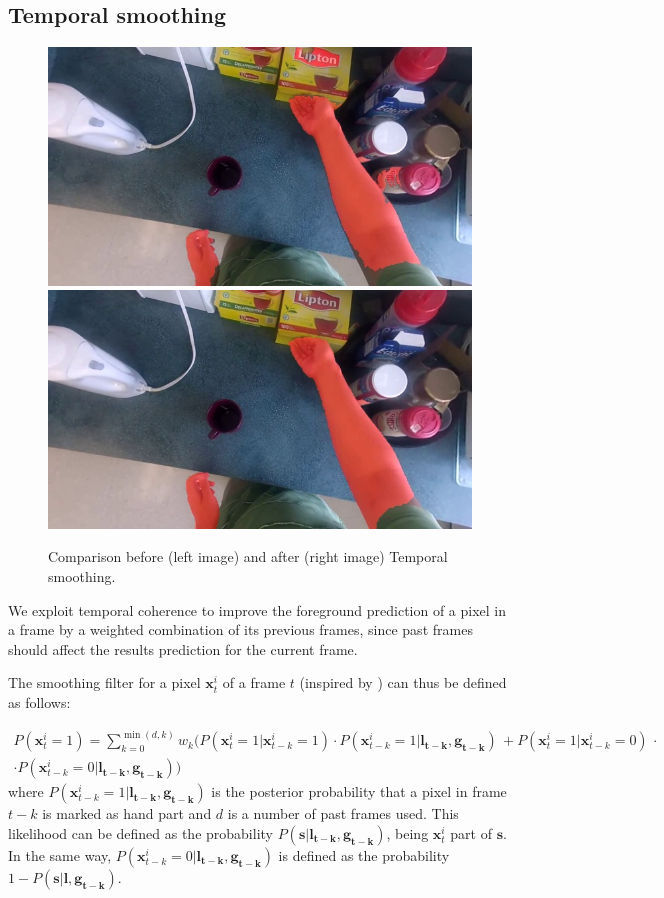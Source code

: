\subsection{Temporal smoothing}
\begin{figure}[tb]
\centering
\includegraphics[width=.45\columnwidth]{./Figures/context-free2.jpg}
\includegraphics[width=.45\columnwidth]{./Figures/context-dependent2.jpg}
\caption{Comparison before (left image) and after (right image) Temporal smoothing.}
\label{fig:gesture_samples_time}
\end{figure}
We exploit temporal coherence to improve the foreground prediction of a pixel in a frame by a weighted combination of
its previous frames, since past frames should affect the results prediction for the current frame.

The smoothing filter for a pixel $\mathbf{x}_{t}^{i}$ of a frame $t$ (inspired by \cite{liu08}) can thus be defined as follows:

\begin{multline}
P(\mathbf{x}_{t}^{i}=1) = \sum_{k = 0}^{\min(d,k)} w_{k} \bigl( P(\mathbf{x}_{t}^{i}=1|\mathbf{x}_{t-k}^{i}=1) \cdot P(\mathbf{x}_{t-k}^{i}=1|\mathbf{l_{t-k}},\mathbf{g_{t-k}})\, + P(\mathbf{x}_{t}^{i}=1|\mathbf{x}_{t-k}^{i}=0) \, \cdot \\
\cdot P(\mathbf{x}_{t-k}^{i}=0|\mathbf{l_{t-k}},\mathbf{g_{t-k}}) \bigr)
\end{multline}
where $P(\mathbf{x}_{t-k}^{i}=1|\mathbf{l_{t-k}},\mathbf{g_{t-k}})$ is the posterior probability
that a pixel in frame $t-k$ is marked as hand part and $d$ is a number of past frames used. This likelihood can be defined as the probability $P(\mathbf{s}|\mathbf{l_{t-k}},\mathbf{g_{t-k}})$, being
$\mathbf{x}_{t}^{i}$ part of $\mathbf{s}$. In the same way, $P(\mathbf{x}_{t-k}^{i}=0|\mathbf{l_{t-k}},\mathbf{g_{t-k}})$ is defined as the probability
$1-P(\mathbf{s}|\mathbf{l},\mathbf{g_{t-k}})$. 

